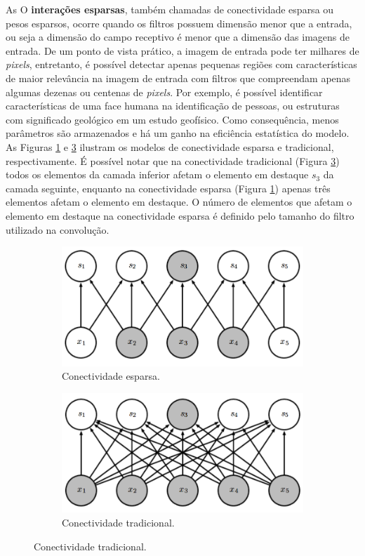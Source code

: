 As O \textbf{interações esparsas}, também chamadas de conectividade esparsa ou pesos esparsos,
ocorre quando os filtros possuem  dimensão menor que a entrada, ou seja a
dimensão do campo receptivo é menor que a dimensão das imagens de entrada.
De um ponto de vista prático, a imagem de entrada pode ter milhares de \textit{pixels}, entretanto, é 
possível detectar apenas pequenas regiões com características de maior relevância na imagem de entrada
com filtros que compreendam apenas algumas dezenas ou centenas de \textit{pixels}.
Por exemplo, é possível identificar características de uma face humana na identificação de pessoas, ou estruturas com
significado geológico em um estudo geofísico. Como consequência,
menos parâmetros são armazenados e há um ganho na eficiência estatística do
modelo. As Figuras \ref{fig:sparse} e \ref{fig:full} ilustram
os modelos de conectividade esparsa e tradicional, respectivamente.
É possível notar que na conectividade tradicional (Figura \ref{fig:full}) todos os elementos da camada inferior
afetam o elemento em destaque $s_3$ da camada seguinte, enquanto na conectividade esparsa (Figura \ref{fig:sparse}) apenas
três elementos afetam o elemento em destaque. O número de elementos que afetam o elemento em destaque na
conectividade esparsa é definido pelo tamanho do filtro utilizado na convolução.

\begin{figure}[htp]
\begin{subfigure}{.5\textwidth}
  \centering
  \includegraphics[width=.9\linewidth]{fig/sparse}
  \caption{Conectividade esparsa.}
  \label{fig:sparse}
\end{subfigure}
\begin{subfigure}{.5\textwidth}
  \centering
  \includegraphics[width=.9\linewidth]{fig/full}
  \caption{Conectividade tradicional.}
  \label{fig:full}
\end{subfigure}%
\end{figure}


